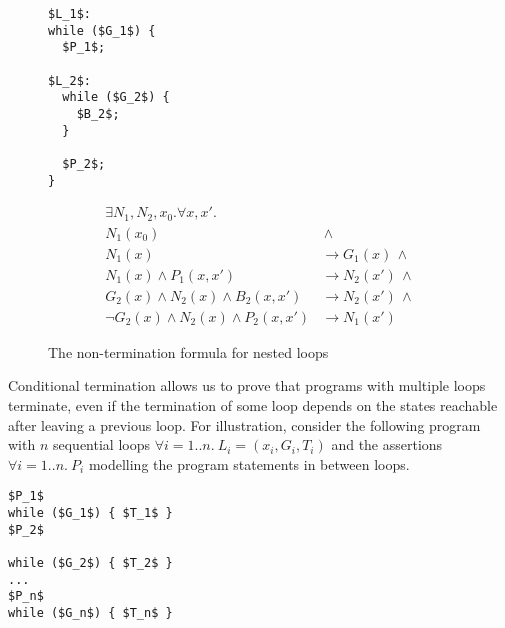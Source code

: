 \documentclass[preprint]{sigplanconf}
\theoremstyle{definition}
\begin{document}
\begin{figure*}
\begin{framed}
 \begin{minipage}{0.19\textwidth}
\begin{lstlisting}[mathescape=true]
$L_1$:
while ($G_1$) {
  $P_1$;

$L_2$:
  while ($G_2$) {
    $B_2$;
  }

  $P_2$;
}
\end{lstlisting}
\end{minipage}
\vline
\begin{minipage}{0.82\textwidth}
\begin{align*}
 \exists N_1, N_2, x_0 . \forall x, x' . \\
  N_1(x_0) & \, \wedge \\
  N_1(x) & \rightarrow G_1(x) \, \wedge \\
  N_1(x) \wedge P_1(x,x') & \rightarrow N_2(x') \, \wedge \\
  G_2(x) \wedge N_2(x) \wedge B_2(x,x') & \rightarrow N_2(x') \, \wedge \\
  \lnot G_2(x) \wedge N_2(x) \wedge P_2(x,x') & \rightarrow N_1(x') 
\end{align*}
\end{minipage}
\end{framed}

\caption{The non-termination formula for nested loops \label{fig:nonterm-nested}}
\end{figure*}


\iffalse

Conditional termination allows us to
prove that programs with multiple loops terminate, even if the termination of some loop depends on the states
reachable after leaving a previous loop.
For illustration, consider the following program with $n$ sequential loops $\forall i=1..n. ~L_i=(x_i,G_i,T_i)$ and
the assertions $\forall i=1..n. ~P_i$ modelling the program statements in between loops. 

\begin{lstlisting}[mathescape=true]
$P_1$
while ($G_1$) { $T_1$ }
$P_2$

while ($G_2$) { $T_2$ }
...
$P_n$
while ($G_n$) { $T_n$ }
\end{lstlisting}
\end{document}
